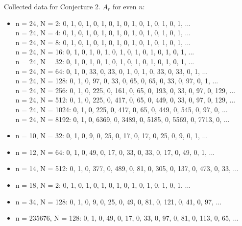 \documentclass{article}
\begin{document}
\begin{flushleft}
    Collected data for Conjecture 2. $A_r$ for even $n$:
    \begin{itemize}
        \item n = 24, N = 2:  0, 1, 0, 1, 0, 1, 0, 1, 0, 1, 0, 1, 0, 1, 0, 1, ...
            \\ n = 24, N = 4:  0, 1, 0, 1, 0, 1, 0, 1, 0, 1, 0, 1, 0, 1, 0, 1, ...
            \\ n = 24, N = 8:  0, 1, 0, 1, 0, 1, 0, 1, 0, 1, 0, 1, 0, 1, 0, 1, ...
            \\ n = 24, N = 16:  0, 1, 0, 1, 0, 1, 0, 1, 0, 1, 0, 1, 0, 1, 0, 1, ...
            \\ n = 24, N = 32:  0, 1, 0, 1, 0, 1, 0, 1, 0, 1, 0, 1, 0, 1, 0, 1, ...
            \\ n = 24, N = 64:  0, 1, 0, 33, 0, 33, 0, 1, 0, 1, 0, 33, 0, 33, 0, 1, ...
            \\ n = 24, N = 128:  0, 1, 0, 97, 0, 33, 0, 65, 0, 65, 0, 33, 0, 97, 0, 1, ...
            \\ n = 24, N = 256:  0, 1, 0, 225, 0, 161, 0, 65, 0, 193, 0, 33, 0, 97, 0, 129, ...
            \\ n = 24, N = 512:  0, 1, 0, 225, 0, 417, 0, 65, 0, 449, 0, 33, 0, 97, 0, 129, ...
            \\ n = 24, N = 1024:  0, 1, 0, 225, 0, 417, 0, 65, 0, 449, 0, 545, 0, 97, 0, ...
            \\ n = 24, N = 8192:  0, 1, 0, 6369, 0, 3489, 0, 5185, 0, 5569, 0, 7713, 0, ...
        \item n = 10, N = 32:  0, 1, 0, 9, 0, 25, 0, 17, 0, 17, 0, 25, 0, 9, 0, 1, ...
        \item n = 12, N = 64:  0, 1, 0, 49, 0, 17, 0, 33, 0, 33, 0, 17, 0, 49, 0, 1, ...
        \item n = 14, N = 512:  0, 1, 0, 377, 0, 489, 0, 81, 0, 305, 0, 137, 0, 473, 0, 33, ...
        \item n = 18, N = 2:  0, 1, 0, 1, 0, 1, 0, 1, 0, 1, 0, 1, 0, 1, 0, 1, ...
        \item n = 34, N = 128:  0, 1, 0, 9, 0, 25, 0, 49, 0, 81, 0, 121, 0, 41, 0, 97, ...
        \item n = 235676, N = 128:  0, 1, 0, 49, 0, 17, 0, 33, 0, 97, 0, 81, 0, 113, 0, 65, ...
    \end{itemize}
    

\end{flushleft}
\end{document}

